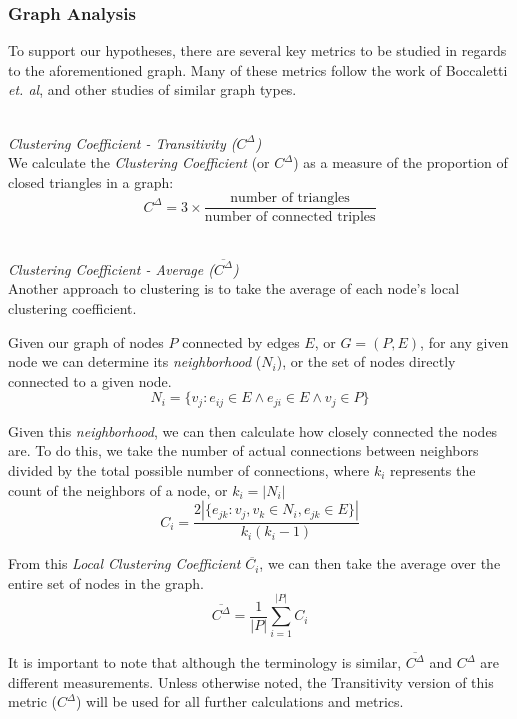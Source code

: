 \documentclass{proc}
\begin{document}
\subsubsection{Graph Analysis}
To support our hypotheses, there are several key metrics to be studied in regards to the aforementioned graph. Many of these metrics follow the work of Boccaletti \textit{et. al}\cite{boccaletti2006complex}, and other studies of similar graph types\cite{latora2001efficient,adamic1999small}.

\noindent\\\textit{Clustering Coefficient - Transitivity ($C^\Delta$)}\\
We calculate the \textit{Clustering Coefficient} (or $C^\Delta$) as a measure of the proportion of closed triangles in a graph\cite{newman2003structure}:
\[C^\Delta = 3 \times \frac{\text{number of triangles}}
                    {\text{number of connected triples}}\]

\noindent\\\textit{Clustering Coefficient - Average ($\overline{C^\Delta}$)}\\
Another approach to clustering is to take the average of each node's local clustering coefficient\cite{watts1998collective}.

Given our graph of nodes $P$ connected by edges $E$, or ${G=(P,E)}$, for any given node we can determine its \textit{neighborhood} ($N_i$), or the set of nodes directly connected to a given node.
\[ N_i = \{v_j : e_{ij} \in E \wedge e_{ji} \in E \wedge v_j \in P\} \]

Given this \textit{neighborhood}, we can then calculate how closely connected the nodes are. To do this, we take the number of actual connections between neighbors divided by the total possible number of connections, where $k_i$ represents the count of the neighbors of a node, or {$k_i = |N_i|$}
\[ C_i = \frac{2|\{e_{jk}: v_j,v_k \in N_i, e_{jk} \in E\}|}{k_i(k_i-1)} \]

From this \textit{Local Clustering Coefficient} $\overline{C_i}$, we can then take the average over the entire set of nodes in the graph.
\[ \overline{C^\Delta} = \frac{1}{|P|}\sum^{|P|}_{i=1}C_i \]

It is important to note that although the terminology is similar\cite{uzzi2005collaboration}, $\overline{C^\Delta}$ and $C^\Delta$ are different measurements. Unless otherwise noted, the Transitivity version of this metric ($C^\Delta$) will be used for all further calculations and metrics.
\end{document}
